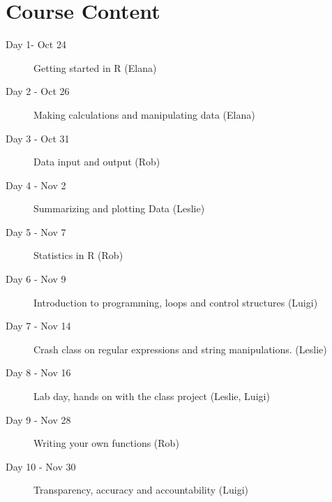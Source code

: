 \documentclass{article}
\begin{document}
\section*{Course Content}
\begin{description}
\item[Day 1- Oct 24]
Getting started in R 
(Elana)

\item[Day 2 - Oct 26] 
Making calculations and manipulating data
(Elana)

\item[Day 3 - Oct 31]
Data input and output
(Rob)


\item[Day 4 - Nov 2]
Summarizing and plotting Data
(Leslie)

\item[Day 5 - Nov 7]
Statistics in R
(Rob)

\item[Day 6 - Nov 9]
Introduction to programming, loops and control structures
(Luigi)

\item[Day 7 - Nov 14]
Crash class on regular expressions and string manipulations.
(Leslie)

\item[Day 8 - Nov 16]
Lab day, hands on with the class project
(Leslie, Luigi)

\item[Day 9 - Nov 28]
Writing your own functions
(Rob)

\item[Day 10 - Nov 30]
Transparency, accuracy and accountability
(Luigi)
\end{description}
\end{document}
